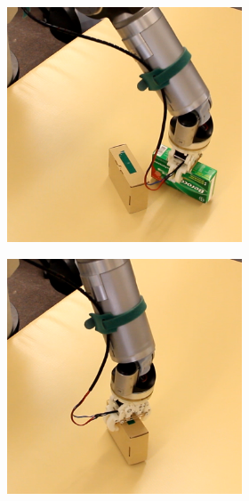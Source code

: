\begin{figure}
\begin{center}
\begin{subfigure}[t]{\textwidth}
\begin{subfigure}[t]{0.195\textwidth}
\end{subfigure}
\begin{subfigure}[t]{0.195\textwidth}
\centering 
\includegraphics[width=\textwidth]{Img/experiments/exp_good/action8c.png}
\end{subfigure}
\begin{subfigure}[t]{0.195\textwidth}
\centering 
\includegraphics[width=\textwidth]{Img/experiments/exp_good/action9c.png}

\end{subfigure}
\end{subfigure}
\end{center}
\end{figure}

